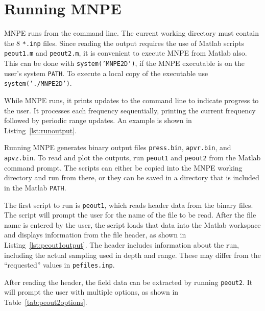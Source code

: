 \section{Running MNPE}

MNPE runs from the command line. The current working directory must contain the 8 \texttt{*.inp} files. Since reading the output requires the use of Matlab scripts \texttt{peout1.m} and \texttt{peout2.m}, it is convenient to execute MNPE from Matlab also. This can be done with \texttt{system('MNPE2D')}, if the MNPE executable is on the user's system \texttt{PATH}. To execute a local copy of the executable use \texttt{system('./MNPE2D')}.

While MNPE runs, it prints updates to the command line to indicate progress to the user. It processes each frequency sequentially, printing the current frequency followed by periodic range updates. An example is shown in Listing~\ref{lst:runoutput}.



Running MNPE generates binary output files \texttt{press.bin}, \texttt{apvr.bin}, and \texttt{apvz.bin}. To read and plot the outputs, run \texttt{peout1} and \texttt{peout2} from the Matlab command prompt. The scripts can either be copied into the MNPE working directory and run from there, or they can be saved in a directory that is included in the Matlab \texttt{PATH}.

The first script to run is \texttt{peout1}, which reads header data from the binary files. The script will prompt the user for the name of the file to be read. After the file name is entered by the user, the script loads that data into the Matlab workspace and displays information from the file header, as shown in Listing~\ref{lst:peout1output}. The header includes information about the run, including the actual sampling used in depth and range. These may differ from the ``requested'' values in \texttt{pefiles.inp}.



After reading the header, the field data can be extracted by running \texttt{peout2}. It will prompt the user with multiple options, as shown in Table~\ref{tab:peout2options}.

